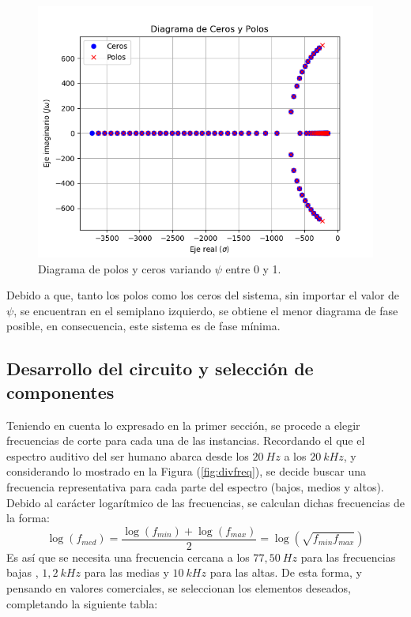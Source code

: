 \documentclass[a4paper]{article}
\begin{document}
\begin{figure}[H]
	\includegraphics[width=\textwidth]{Imagenes/Zplanepsi.png}
\caption{Diagrama de polos y ceros variando $\psi$ entre 0 y 1.}
	\label{fig:zplanepsi}
\end{figure}

Debido a que, tanto los polos como los ceros del sistema, sin importar el valor de $\psi$, se encuentran en el semiplano izquierdo, se obtiene el menor diagrama de fase posible, en consecuencia, este sistema es de fase mínima. 

\subsection{Desarrollo del circuito y selección de componentes}

Teniendo en cuenta lo expresado en la primer sección, se procede a elegir frecuencias de corte para cada una de las instancias. Recordando el que el espectro auditivo del ser humano abarca desde los $20 \ Hz$ a los $20 \ kHz$, y considerando lo mostrado en la Figura (\ref{fig:divfreq}), se decide buscar una frecuencia representativa para cada parte del espectro (bajos, medios y altos). Debido al carácter logarítmico de las frecuencias, se calculan dichas frecuencias de la forma:
\begin{equation*}
	\log{(f_{med})} = \frac{\log(f_{min}) + \log(f_{max})}{2} = \log(\sqrt{f_{min} f_{max}})
\end{equation*}
 Es así que se necesita una frecuencia cercana a los $77,50 \ Hz$ para las frecuencias bajas , $1,2 \ kHz$ para las medias y $10 \ kHz$ para las altas. De esta forma, y pensando en valores comerciales, se seleccionan los elementos deseados, completando la siguiente tabla:
\end{document}
